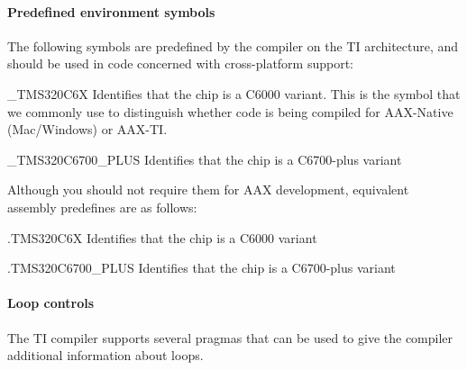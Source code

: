 \hypertarget{a00362_subsubsection__predefined_environment_symbols_}{}\paragraph{Predefined environment symbols}\label{a00362_subsubsection__predefined_environment_symbols_}
 The following symbols are predefined by the compiler on the T\+I architecture, and should be used in code concerned with cross-\/platform support\+:


\begin{DoxyItemize}
\item {\ttfamily \+\_\+\+T\+M\+S320\+C6\+X} Identifies that the chip is a C6000 variant. This is the symbol that we commonly use to distinguish whether code is being compiled for A\+A\+X-\/\+Native (Mac/\+Windows) or A\+A\+X-\/\+T\+I. 
\item {\ttfamily \+\_\+\+T\+M\+S320\+C6700\+\_\+\+P\+L\+U\+S} Identifies that the chip is a C6700-\/plus variant  
\end{DoxyItemize}

Although you should not require them for A\+A\+X development, equivalent assembly predefines are as follows\+:


\begin{DoxyItemize}
\item {\ttfamily .T\+M\+S320\+C6\+X} Identifies that the chip is a C6000 variant  
\item {\ttfamily .T\+M\+S320\+C6700\+\_\+\+P\+L\+U\+S} Identifies that the chip is a C6700-\/plus variant 
\end{DoxyItemize}

\hypertarget{a00362_subsubsection__loop_controls_}{}\paragraph{Loop controls}\label{a00362_subsubsection__loop_controls_}
 The T\+I compiler supports several pragmas that can be used to give the compiler additional information about loops.



